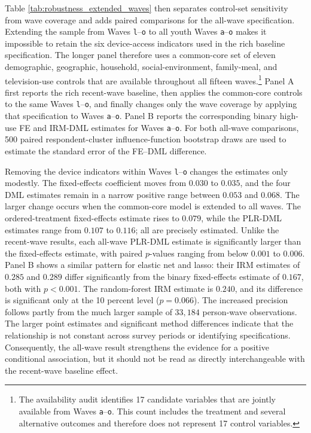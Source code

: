 \documentclass[11pt,oneside,a4paper]{book}
\begin{document}
Table \ref{tab:robustness_extended_waves} then separates control-set sensitivity from wave coverage and adds paired comparisons for the all-wave specification. Extending the sample from Waves \texttt{l}--\texttt{o} to all youth Waves \texttt{a}--\texttt{o} makes it impossible to retain the six device-access indicators used in the rich baseline specification. The longer panel therefore uses a common-core set of eleven demographic, geographic, household, social-environment, family-meal, and television-use controls that are available throughout all fifteen waves.\footnote{The availability audit identifies 17 candidate variables that are jointly available from Waves \texttt{a}--\texttt{o}. This count includes the treatment and several alternative outcomes and therefore does not represent 17 control variables.} Panel A first reports the rich recent-wave baseline, then applies the common-core controls to the same Waves \texttt{l}--\texttt{o}, and finally changes only the wave coverage by applying that specification to Waves \texttt{a}--\texttt{o}. Panel B reports the corresponding binary high-use FE and IRM-DML estimates for Waves \texttt{a}--\texttt{o}. For both all-wave comparisons, 500 paired respondent-cluster influence-function bootstrap draws are used to estimate the standard error of the FE--DML difference.



Removing the device indicators within Waves \texttt{l}--\texttt{o} changes the estimates only modestly. The fixed-effects coefficient moves from \(0.030\) to \(0.035\), and the four DML estimates remain in a narrow positive range between \(0.053\) and \(0.068\). The larger change occurs when the common-core model is extended to all waves. The ordered-treatment fixed-effects estimate rises to \(0.079\), while the PLR-DML estimates range from \(0.107\) to \(0.116\); all are precisely estimated. Unlike the recent-wave results, each all-wave PLR-DML estimate is significantly larger than the fixed-effects estimate, with paired \(p\)-values ranging from below \(0.001\) to \(0.006\). Panel B shows a similar pattern for elastic net and lasso: their IRM estimates of \(0.285\) and \(0.289\) differ significantly from the binary fixed-effects estimate of \(0.167\), both with \(p<0.001\). The random-forest IRM estimate is \(0.240\), and its difference is significant only at the 10 percent level (\(p=0.066\)). The increased precision follows partly from the much larger sample of \(33{,}184\) person-wave observations. The larger point estimates and significant method differences indicate that the relationship is not constant across survey periods or identifying specifications. Consequently, the all-wave result strengthens the evidence for a positive conditional association, but it should not be read as directly interchangeable with the recent-wave baseline effect.
\end{document}
